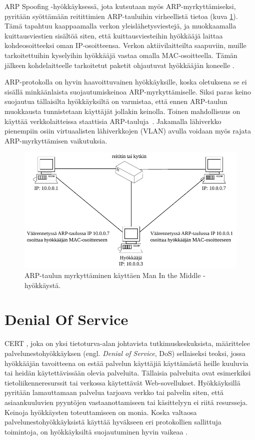 ARP Spoofing -hyökkäyksessä, jota kutsutaan myös ARP-myrkyttämiseksi,
pyritään syöttämään reitittimien ARP-tauluihin virheellistä
tietoa (kuva \ref{ARP-spoofing}). Tämä tapahtuu kaappaamalla verkon
yleislähetysviestejä, ja muokkaamalla kuittausviestien sisältöä siten,
että kuittausviesteihin hyökkääjä laittaa kohdeosoitteeksi oman
IP-osoitteensa. Verkon aktiivilaitteilta saapuviin, muille
tarkoitettuihin kyselyihin hyökkääjä vastaa omalla MAC-osoitteella.  Tämän
jälkeen kohdelaitteelle tarkoitetut paketit ohjautuvat hyökkääjän
koneelle \cite{WEBS}.

ARP-protokolla on hyvin haavoittuvainen hyökkäyksille, koska
oletuksena se ei sisällä minkäänlaista suojautumiskeinoa
ARP-myrkyttämiselle. Siksi paras keino suojautua tällaisilta
hyökkäyksiltä on varmistaa, että ennen ARP-taulun muokkausta
tunnistetaan käyttäjät jollakin keinolla. Toinen mahdollisuus on
käyttää verkkolaitteissa staattisia ARP-tauluja~\cite{WEBS}. Jakamalla
lähiverkko pienempiin osiin virtuaalisten lähiverkkojen (VLAN) avulla
voidaan myös rajata ARP-myrkyttämisen vaikutuksia.

\begin{figure}[ht]
\centering
\includegraphics[width=13.5cm]{pics/arp.pdf}
\caption{ARP-taulun myrkyttäminen käyttäen Man In the Middle -hyökkäystä.}
\label{ARP-spoofing}
\end{figure}

\section{Denial Of Service}

CERT \cite{CERT}, joka on yksi tietoturva-alan johtavista
tutkimuskeskuksista, määrittelee palvelunestohyökkäyksen
(engl. \textit{Denial of Service}, DoS) sellaiseksi teoksi, jossa
hyökkääjän tavoitteena on estää palvelun käyttäjiä käyttämästä heille
kuuluvia tai heidän käytettävissään olevia palveluita. Tällaisia
palveluita ovat esimerkiksi tietoliikenneresurssit tai verkossa
käytettävät Web-sovellukset. Hyökkäyksillä pyritään lamauttamaan
palvelua tarjoava verkko tai palvelin siten, että asiaankuuluvien
pyyntöjen vastaanottamiseen tai käsittelyyn ei riitä
resursseja. Keinoja hyökkäysten toteuttamiseen on monia. Koska
valtaosa palvelunestohyökkäyksistä käyttää hyväkseen eri protokollien
sallittuja toimintoja, on hyökkäyksiltä suojautuminen hyvin vaikeaa
\cite{Hacking}.

